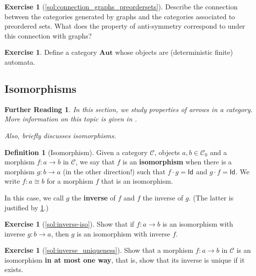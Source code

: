 \documentclass[a4paper,10pt]{scrartcl}
\theoremstyle{plain}
\newtheorem*{reading*}{Further Reading}
\theoremstyle{definition}
\newtheorem{dfn}[thm]{Definition}
\newtheorem{exer}[thm]{Exercise}
\newcommand{\cfont}[1]{\ensuremath{\mathsf{#1}}}
\newcommand{\Cat}[1]{\mathcal{#1}}
\newcommand{\CC}{\Cat{C}}
\newcommand{\Catb}[1]{\mathbf{#1}}
\newcommand{\Ob}[1]{{#1}_0}
\newcommand{\Id}[1][]{\cfont{Id}_{#1}}
\newcommand{\Comp}{\cdot}
\begin{document}
\begin{exer}[\cref{sol:connection_graphs_preordersets}] \label{exer:connection_graphs_preordersets}
Describe the connection between the categories generated by graphs and the categories associated to preordered sets. What does the property of anti-symmetry correspond to under this connection with graphs?
\end{exer}

\begin{exer} Define a category $\Catb{Aut}$ whose objects are (deterministic finite) automata. 
\end{exer}

\subsection{Isomorphisms}
\label{sec:isos}

\begin{reading*}
  In this section, we study properties of arrows in a category.
  More information on this topic is given in \cite[\S 2.7]{barr-wells}.

  Also, \cite[\S 2.2]{pierce} briefly discusses isomorphisms.
\end{reading*}


\begin{dfn}[Isomorphism]
  Given a category $\CC$, objects $a,b \in \Ob{\CC}$ and a morphism $f : a \to b$ in $\CC$, we say that $f$ is an \textbf{isomorphism} when there is a morphism $g : b \to a$ (in the other direction!) such that $f \Comp g = \Id$ and $g \Comp f = \Id$.
  We write $f : a \cong b$ for a morphism $f$ that is an isomorphism.

  In this case, we call $g$ the \textbf{inverse} of $f$ and $f$ the inverse of $g$. (The latter is justified by \cref{exer:inverse-iso}.)
\end{dfn}

\begin{exer}[\cref{sol:inverse-iso}]\label{exer:inverse-iso}
  Show that if $f : a \to b$ is an isomorphism with inverse $g : b \to a$, then $g$ is an isomorphism with inverse $f$.
\end{exer}

\begin{exer}[\cref{sol:inverse_uniqueness}]\label{exer:inverse_uniqueness}
  Show that a morphism $f : a \to b$ in $\CC$ is an isomorphism \textbf{in at most one way}, that is, show that its inverse is unique if it exists.
\end{exer}
\end{document}
